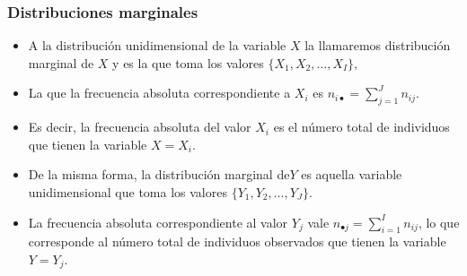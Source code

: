 \begin{frame}
\frametitle {Distribuciones marginales}
\begin{itemize}
\item A la distribución unidimensional de la variable $X$ la llamaremos distribución marginal
de $X$ y es la que toma los valores $\{X_1,X_2,\ldots,X_I\},$
\item La que la frecuencia absoluta correspondiente a $X_i$   es $n_{i \bullet}=\sum\limits_{j=1}^{J} n_{ij}$.
\item Es decir, la frecuencia absoluta del valor $X_i$ es el número total de
 individuos que tienen la variable $X=X_i$.
\item De la misma forma, la distribución marginal de$Y$ es aquella variable unidimensional que
toma los valores $\{Y_1,Y_2,\ldots,Y_J\}.$
\item La  frecuencia absoluta correspondiente al valor   $Y_j$     vale $n_{\bullet j}=\sum\limits_{i=1}^{I} n_{ij}$, lo que corresponde al número total de individuos observados que tienen la variable $Y=Y_j$.
\end{itemize}
\end{frame}



